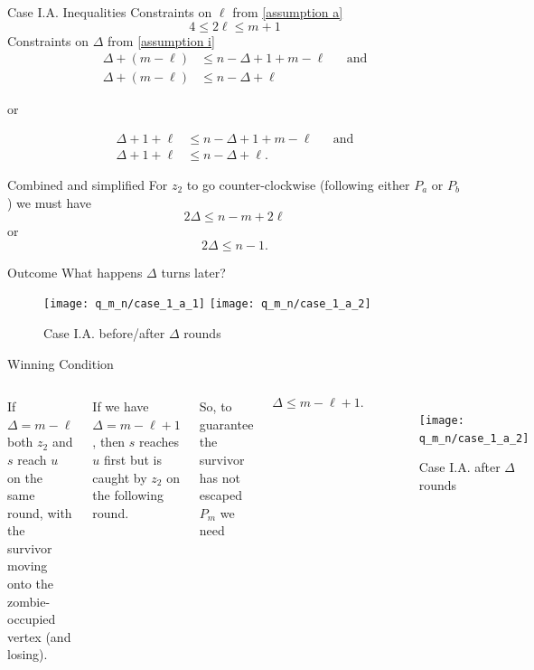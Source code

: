 \begin{frame}{Case I.A. Inequalities}
Constraints on $\ell$ from \ref{assumption a}
\[ 4 \leq 2 \ell \leq m + 1 \]
Constraints on $\Delta$ from \ref{assumption i}
\begin{align*}
 \Delta + (m - \ell) &\leq n - \Delta + 1 + m - \ell && \text{and} \\
 \Delta + (m - \ell) &\leq n - \Delta + \ell
\end{align*}
\begin{center}or\end{center}
\begin{align*}
 \Delta + 1 + \ell &\leq n - \Delta + 1 + m - \ell && \text{and} \\
 \Delta + 1 + \ell &\leq n - \Delta + \ell .
\end{align*}
\end{frame}

\begin{frame}{Combined and simplified}
For $z_2$ to go counter-clockwise (following either $P_a$ or $P_b$) we must have
\centering
\[ 2 \Delta \leq n - m + 2\ell \]
or
\[ 2 \Delta \leq n - 1 .\]
\end{frame}

\begin{frame}{Outcome}
What happens $\Delta$ turns later?
\begin{figure}
\texttt{[image: q\_m\_n/case\_1\_a\_1]}
\texttt{[image: q\_m\_n/case\_1\_a\_2]}
\caption{Case I.A. before/after $\Delta$ rounds}
\end{figure}
\end{frame}

\begin{frame}{Winning Condition}
\begin{columns}
If $\Delta = m - \ell$ both $z_2$ and $s$ reach $u$ on the same round,
with the survivor moving onto the zombie-occupied vertex (and losing).

If we have $\Delta = m - \ell + 1$, then $s$ reaches $u$ first
but is caught by $z_2$ on the following round.

So, to guarantee the survivor has not escaped $P_m$ we need

\[ \Delta \leq m- \ell + 1 .\]

\begin{figure}
\texttt{[image: q\_m\_n/case\_1\_a\_2]}
\caption{Case I.A. after $\Delta$ rounds}
\end{figure}
\end{columns}
\end{frame}

